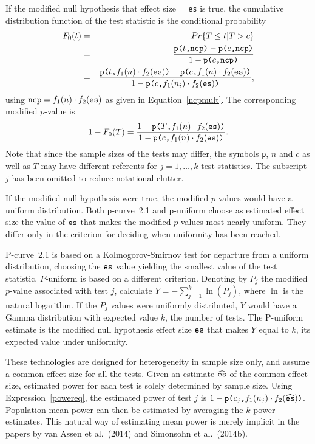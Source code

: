 \documentclass[jou]{apa6} %
\newcommand{\R}[1]{\mbox{\texttt{#1}}} %
\begin{document}
If the modified null hypothesis that effect size = \texttt{es} is true, the cumulative distribution function of the test statistic is the conditional probability
\begin{eqnarray*}
    F_0(t) & = & Pr\{T \leq t | T > c\} \\
    & = & \frac{\R{p(}t\R{,ncp}\R{)}-\R{p(}c\R{,ncp}\R{)}}{1-\R{p(}c\R{,ncp}\R{)}} \\
    & = & \frac{\R{p(}t\R{,}f_1(n)\cdot f_2(\R{es})\R{)}-\R{p(}c\R{,}f_1(n)\cdot f_2(\R{es})\R{)}}
               {1-\R{p(}c\R{,}f_1(n_i)\cdot f_2(\R{es})\R{)}} ,
\end{eqnarray*}
using $\R{ncp} = f_1(n)\cdot f_2(\R{es})$ as given in Equation~\ref{ncpmult}. The corresponding modified $p$-value 
is 
\begin{displaymath}
    1-F_0(T) = \frac{1-\R{p(}T\R{,}f_1(n)\cdot f_2(\R{es})\R{)}}
               {1-\R{p(}c\R{,}f_1(n)\cdot f_2(\R{es})\R{)}}.
\end{displaymath} 
Note that since the sample sizes of the tests may differ, the symbols \texttt{p}, $n$ and $c$ as well as $T$ may %
have different referents for $j=1, \ldots, k$ test statistics. The subscript $j$ has been omitted to reduce notational clutter.

If the modified null hypothesis were true, the modified $p$-values would have a uniform distribution. Both p-curve~2.1 and p-uniform choose as estimated effect size the value of $\R{es}$ that makes the modified $p$-values most nearly uniform. They differ only in the criterion for deciding when uniformity has been reached. 

P-curve~2.1 is based on a Kolmogorov-Smirnov test for departure from a uniform distribution, choosing the $\R{es}$ value yielding the smallest value of the test statistic. $P$-uniform is based on a different criterion. Denoting by $P_j$ the modified $p$-value associated with test $j$, calculate $Y = -\sum_{j=1}^k\ln({P_j})$, where $\ln$ is the natural logarithm. If the $P_j$ values were uniformly distributed, $Y$ would have a Gamma distribution with expected value $k$, the number of tests. The P-uniform estimate is the modified null hypothesis effect size $\R{es}$ that makes $Y$ equal to $k$, its expected value under uniformity.

These technologies are designed for heterogeneity in sample size only, and assume a common effect size for all the tests. Given an estimate $\widehat{\R{es}}$ of the common effect size, estimated power for each test is solely determined by sample size. Using Expression~\ref{powereq}, the estimated power of test $j$ is $1-\R{p(}c_j\R{,}f_1(n_j)\cdot f_2(\widehat{\R{es}})\R{)}$. Population mean power can then be estimated by averaging the $k$ power estimates. This natural way of estimating mean power is merely implicit in the papers by van Assen et al.~(2014) and Simonsohn et al.~(2014b). 
\end{document}
